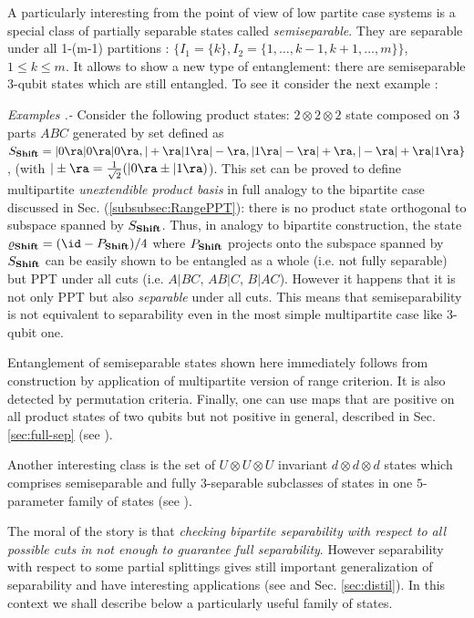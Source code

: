 \documentclass[twocolumn,aps,rmp]{revtex4}
\begin{document}
A particularly interesting from the point of view of low partite
case systems is a special class of partially separable states called
{\it semiseparable}. They are separable under all 1-(m-1) partitions
: $\{ I_{1}=\{ k \}, I_{2}=\{ 1,\ldots,k-1,k+1,\ldots,m \} \}$, $1 \leq k
\leq m $. It allows to show a new type of entanglement: there are
semiseparable $3$-qubit states which are still entangled. To see it
consider the next example \cite{UPB2}:

{\it Examples .-} Consider the following product states: $2 \otimes 2
\otimes 2$ state composed on 3 parts $ABC$ generated by set defined as
$S_{\bf Shift}=|0\ra|0\ra|0\ra,|+\ra|1\ra|-\ra,|1\ra|-\ra|+\ra,
|-\ra|+\ra|1\ra \}$, (with $|\pm\ra=\frac{1}{\sqrt{2}}(|0\ra\pm
|1\ra)$). This set can be proved to define multipartite {\it
  unextendible product basis} in full analogy to the bipartite case
discussed in Sec. (\ref{subsubsec:RangePPT}): there is no product
state orthogonal to subspace spanned by $S_{\bf Shift}$. Thus, in
analogy to bipartite construction, the state $\varrho_{\bf
  Shift}=(\id-P_{\bf Shift})/4$ where $P_{\bf Shift}$ projects onto
the subspace spanned by $S_{\bf Shift}$ can be easily shown to be
entangled as a whole (i.e. not fully separable) but PPT under all cuts
(i.e. $A|BC$, $AB|C$, $B|AC$). However it happens that it is not only
PPT but also {\it separable} under all cuts. This means that
semiseparability is not equivalent to separability even in the most
simple multipartite case like $3$-qubit one.

Entanglement of semiseparable states shown here immediately follows
from construction by application of multipartite version of range
criterion. It is also detected by permutation criteria.  Finally, one
can use maps that are positive on all product states of two qubits but
not positive in general, described in Sec. \ref{sec:full-sep} (see
\cite{Ho00}).

Another interesting class is the set of $U \otimes U \otimes U$
invariant $d \otimes d \otimes d$ states which comprises semiseparable
and fully 3-separable subclasses of states in one $5$-parameter family
of states (see \cite{UUU}).

The moral of the story is that {\it checking bipartite separability
  with respect to all possible cuts in not enough to guarantee full
  separability}. However separability with respect to some partial
splittings gives still important generalization of separability and
have interesting applications (see
\cite{Smolin,DCpur,DurC_multi_dist2000,DurCirac_activation} and
Sec. \ref{sec:distil}). In this context we shall describe below a
particularly useful family of states.
\end{document}
